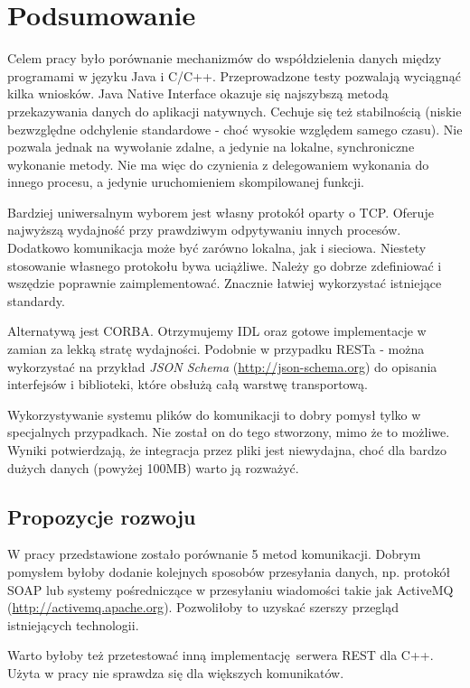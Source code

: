 \chapter{Podsumowanie}

Celem pracy było porównanie mechanizmów do współdzielenia danych między programami w języku Java i C/C++. Przeprowadzone testy pozwalają wyciągnąć kilka wniosków.
Java Native Interface okazuje się najszybszą metodą przekazywania danych do aplikacji natywnych. Cechuje się też stabilnością (niskie bezwzględne odchylenie standardowe - choć wysokie względem samego czasu). Nie pozwala jednak na wywołanie zdalne, a jedynie na lokalne, synchroniczne wykonanie metody. Nie ma więc do czynienia z delegowaniem wykonania do innego procesu, a jedynie uruchomieniem skompilowanej funkcji.

Bardziej uniwersalnym wyborem jest własny protokół oparty o TCP. Oferuje najwyższą wydajność przy prawdziwym odpytywaniu innych procesów. Dodatkowo komunikacja może być zarówno lokalna, jak i sieciowa. Niestety stosowanie własnego protokołu bywa uciążliwe. Należy go dobrze zdefiniować i wszędzie poprawnie zaimplementować. Znacznie łatwiej wykorzystać istniejące standardy.

Alternatywą jest CORBA. Otrzymujemy IDL oraz gotowe implementacje w zamian za lekką stratę wydajności. Podobnie w przypadku RESTa - można wykorzystać na przykład \textit{JSON Schema} (\url{http://json-schema.org}) do opisania interfejsów i biblioteki, które obsłużą całą warstwę transportową.

Wykorzystywanie systemu plików do komunikacji to dobry pomysł tylko w specjalnych przypadkach. Nie został on do tego stworzony, mimo że to możliwe. Wyniki potwierdzają, że integracja przez pliki jest niewydajna, choć dla bardzo dużych danych (powyżej 100MB) warto ją rozważyć.


\section{Propozycje rozwoju}

W pracy przedstawione zostało porównanie 5 metod komunikacji. Dobrym pomysłem byłoby dodanie kolejnych sposobów przesyłania danych, np. protokół SOAP lub systemy pośredniczące w przesyłaniu wiadomości takie jak ActiveMQ (\url{http://activemq.apache.org}). Pozwoliłoby to uzyskać szerszy przegląd istniejących technologii.

Warto byłoby też przetestować inną implementację serwera REST dla C++. Użyta w pracy nie sprawdza się dla większych komunikatów.
